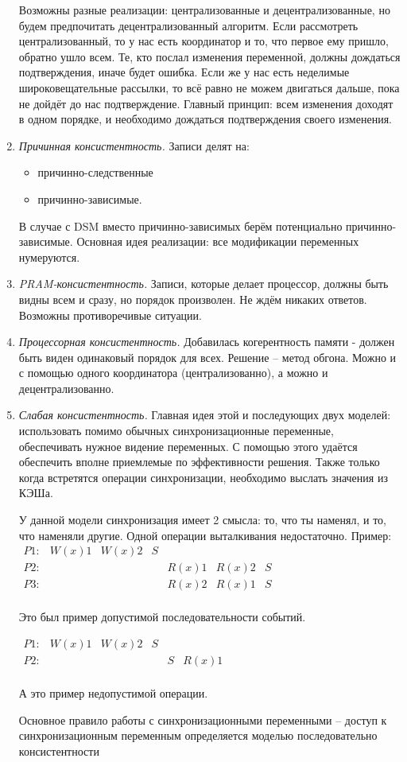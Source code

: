 \documentclass[a4paper,12pt]{article}
\begin{document}
\begin{enumerate}
		Возможны разные реализации: централизованные и децентрализованные, но будем
	предпочитать децентрализованный алгоритм. Если рассмотреть централизованный, то у нас есть
	координатор и то, что первое ему пришло, обратно ушло всем. Те, кто послал изменения 
	переменной, должны дождаться подтверждения, иначе будет ошибка. Если же у нас есть
	неделимые широковещательные рассылки, то всё равно не можем двигаться дальше, пока не
	дойдёт до нас подтверждение. Главный принцип: всем изменения доходят в одном порядке,
	и необходимо дождаться подтверждения своего изменения.
		\item {\em Причинная консистентность.} Записи делят на: 
			\begin{itemize}
				\item причинно-следственные
				\item причинно-зависимые.
			\end{itemize}
		В случае с DSM вместо причинно-зависимых берём потенциально причинно-зависимые.
	Основная идея реализации: все модификации переменных нумеруются.
		\item {\em PRAM-консистентность.} Записи, которые делает процессор, должны быть видны всем
		и сразу, но порядок произволен. Не ждём никаких ответов. Возможны противоречивые
		ситуации.
		\item {\em Процессорная консистентность.} Добавилась когерентность памяти - должен быть
		виден одинаковый порядок для всех. Решение -- метод обгона. Можно и с помощью одного
		координатора (централизованно), а можно и децентрализованно.
		\item {\em Слабая консистентность.} Главная идея этой и последующих двух моделей: 
		использовать помимо обычных	синхронизационные переменные, обеспечивать нужное видение 
		переменных. С помощью этого	удаётся обеспечить вполне приемлемые по эффективности 
		решения. Также только когда	встретятся операции синхронизации, необходимо выслать
		значения из КЭШа. 
		
		У данной модели синхронизация имеет 2 смысла: то, что ты наменял, и то, что наменяли 
		другие. Одной операции выталкивания недостаточно. Пример:
		$\begin{array}{ccccccc}
		P1: & W(x)1 & W(x)2 & S \\
		P2: & & & & R(x)1 & R(x)2 & S \\
		P3: & & & & R(x)2 & R(x)1 & S\\
		\end{array}$
		
		Это был пример допустимой последовательности событий.
		
		$\begin{array}{cccccc}
		P1: & W(x)1 & W(x)2 & S \\
		P2: & & & & S & R(x)1 \\
		\end{array}$
		
		А это пример недопустимой операции.
		
		Основное правило работы с синхронизационными переменными -- доступ к синхронизационным 
		переменным определяется моделью последовательно	консистентности
	\end{enumerate}
\end{document}

